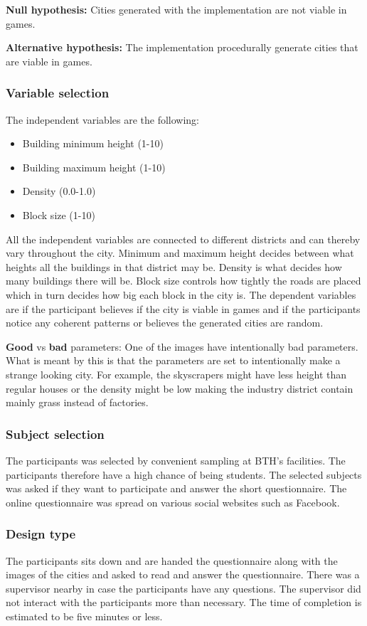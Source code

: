 	\textbf{Null hypothesis:} Cities generated with the implementation are not viable in games.
			
	\textbf{Alternative hypothesis:} The implementation procedurally generate cities that are viable in games.
			
	\subsubsection{Variable selection}
	The independent variables are the following:
	\begin{itemize}
		\item Building minimum height (1-10)
		\item Building maximum height (1-10)
		\item Density (0.0-1.0)
		\item Block size (1-10)
	\end{itemize}
	All the independent variables are connected to different districts and can thereby vary throughout the city. Minimum and maximum height decides between what heights all the buildings in that district may be. Density is what decides how many buildings there will be. Block size controls how tightly the roads are placed which in turn decides how big each block in the city is. The dependent variables are if the participant believes if the city is viable in games and if the participants notice any coherent patterns or believes the generated cities are random.
			
	\textbf{Good} vs \textbf{bad} parameters: One of the images have intentionally bad parameters. What is meant by this is that the parameters are set to intentionally make a strange looking city. For example, the skyscrapers might have less height than regular houses or the density might be low making the industry district contain mainly grass instead of factories.
			
	\subsubsection{Subject selection}
	The participants was selected by convenient sampling at BTH’s facilities. The participants therefore have a high chance of being students. The selected subjects was asked if they want to participate and answer the short questionnaire. The online questionnaire was spread on various social websites such as Facebook.
			
	\subsubsection{Design type}
	The participants sits down and are handed the questionnaire along with the images of the cities and asked to read and answer the questionnaire. There was a supervisor nearby in case the participants have any questions. The supervisor did not interact with the participants more than necessary.  The time of completion is estimated to be five minutes or less.
			
